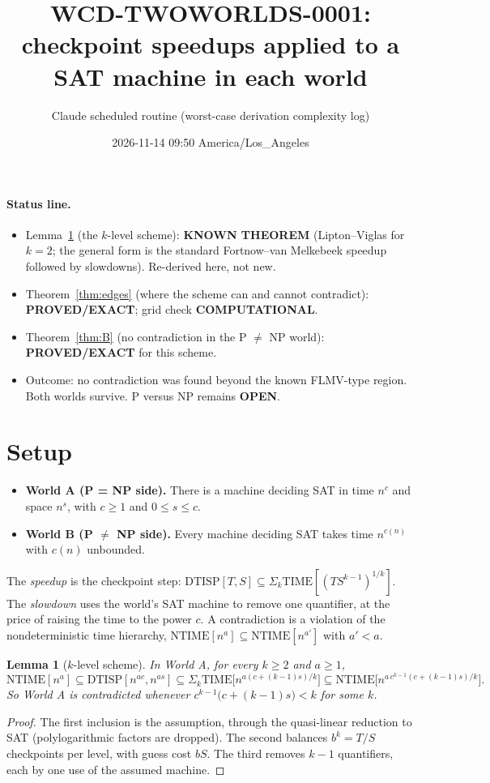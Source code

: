 \documentclass[11pt]{article}
\title{WCD-TWOWORLDS-0001: checkpoint speedups applied to a SAT machine in each world}
\author{Claude scheduled routine (worst-case derivation complexity log)}
\date{2026-11-14 09:50 America/Los\_Angeles}
\newtheorem{lemma}[theorem]{Lemma}
\begin{document}
\maketitle

\paragraph{Status line.}
\begin{itemize}
\item Lemma~\ref{lem:scheme} (the $k$-level scheme): \textbf{KNOWN THEOREM} (Lipton--Viglas for $k=2$; the general form is the standard Fortnow--van Melkebeek speedup followed by slowdowns). Re-derived here, not new.
\item Theorem~\ref{thm:edges} (where the scheme can and cannot contradict): \textbf{PROVED/EXACT}; grid check \textbf{COMPUTATIONAL}.
\item Theorem~\ref{thm:B} (no contradiction in the P $\ne$ NP world): \textbf{PROVED/EXACT} for this scheme.
\item Outcome: no contradiction was found beyond the known FLMV-type region. Both worlds survive. P versus NP remains \textbf{OPEN}.
\end{itemize}

\section{Setup}
\begin{itemize}
\item \textbf{World A (P = NP side).} There is a machine deciding SAT in time $n^{c}$ and space $n^{s}$, with $c\ge1$ and $0\le s\le c$.
\item \textbf{World B (P $\ne$ NP side).} Every machine deciding SAT takes time $n^{c(n)}$ with $c(n)$ unbounded.
\end{itemize}
The \emph{speedup} is the checkpoint step: $\mathrm{DTISP}[T,S]\subseteq\Sigma_k\mathrm{TIME}[(T S^{k-1})^{1/k}]$. The \emph{slowdown} uses the world's SAT machine to remove one quantifier, at the price of raising the time to the power $c$. A contradiction is a violation of the nondeterministic time hierarchy, $\mathrm{NTIME}[n^{a}]\subseteq\mathrm{NTIME}[n^{a'}]$ with $a'<a$.

\begin{lemma}[$k$-level scheme]\label{lem:scheme}
In World A, for every $k\ge2$ and $a\ge1$,
\[\mathrm{NTIME}[n^{a}]\subseteq\mathrm{DTISP}[n^{ac},n^{as}]\subseteq\Sigma_k\mathrm{TIME}\bigl[n^{a(c+(k-1)s)/k}\bigr]\subseteq\mathrm{NTIME}\bigl[n^{a\,c^{k-1}(c+(k-1)s)/k}\bigr].\]
So World A is contradicted whenever $c^{k-1}\bigl(c+(k-1)s\bigr)<k$ for some $k$.
\end{lemma}
\begin{proof}
The first inclusion is the assumption, through the quasi-linear reduction to SAT (polylogarithmic factors are dropped). The second balances $b^{k}=T/S$ checkpoints per level, with guess cost $bS$. The third removes $k-1$ quantifiers, each by one use of the assumed machine.
\end{proof}
\end{document}
